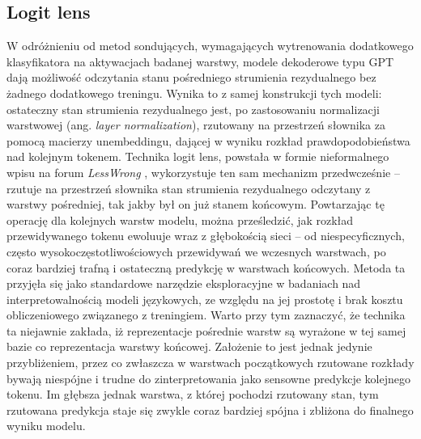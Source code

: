 \subsection{Logit lens}
\label{sec:logit_lens}
W odróżnieniu od metod sondujących, wymagających wytrenowania dodatkowego klasyfikatora na aktywacjach badanej warstwy, modele dekoderowe typu GPT dają możliwość odczytania stanu pośredniego strumienia rezydualnego bez żadnego dodatkowego treningu. Wynika to z samej konstrukcji tych modeli: ostateczny stan strumienia rezydualnego jest, po zastosowaniu normalizacji warstwowej (ang. \textit{layer normalization}), rzutowany na przestrzeń słownika za pomocą macierzy unembeddingu, dającej w wyniku rozkład prawdopodobieństwa nad kolejnym tokenem. Technika logit lens, powstała w formie nieformalnego wpisu na forum \textit{LessWrong} \cite{nostalgebraist_2020_logit_lens}, wykorzystuje ten sam mechanizm przedwcześnie -- rzutuje na przestrzeń słownika stan strumienia rezydualnego odczytany z warstwy pośredniej, tak jakby był on już stanem końcowym. Powtarzając tę operację dla kolejnych warstw modelu, można prześledzić, jak rozkład przewidywanego tokenu ewoluuje wraz z głębokością sieci -- od niespecyficznych, często wysokoczęstotliwościowych przewidywań we wczesnych warstwach, po coraz bardziej trafną i ostateczną predykcję w warstwach końcowych. \newline
Metoda ta przyjęła się jako standardowe narzędzie eksploracyjne w badaniach nad interpretowalnością modeli językowych, ze względu na jej prostotę i brak kosztu obliczeniowego związanego z treningiem. Warto przy tym zaznaczyć, że technika ta niejawnie zakłada, iż reprezentacje pośrednie warstw są wyrażone w tej samej bazie co reprezentacja warstwy końcowej. Założenie to jest jednak jedynie przybliżeniem, przez co zwłaszcza w warstwach początkowych rzutowane rozkłady bywają niespójne i trudne do zinterpretowania jako sensowne predykcje kolejnego tokenu. Im głębsza jednak warstwa, z której pochodzi rzutowany stan, tym rzutowana predykcja staje się zwykle coraz bardziej spójna i zbliżona do finalnego wyniku modelu.

